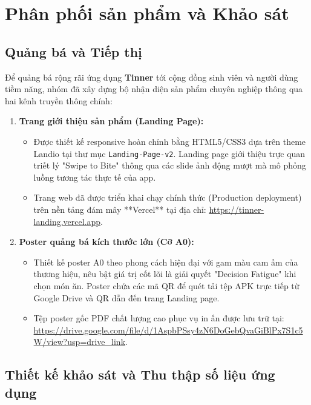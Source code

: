 \section{Phân phối sản phẩm và Khảo sát}
\label{sec:product_distribution}

\subsection{Quảng bá và Tiếp thị}
\label{subsec:marketing_promo}

Để quảng bá rộng rãi ứng dụng \textbf{Tinner} tới cộng đồng sinh viên và người dùng tiềm năng, nhóm đã xây dựng bộ nhận diện sản phẩm chuyên nghiệp thông qua hai kênh truyền thông chính:

\begin{enumerate}
    \item \textbf{Trang giới thiệu sản phẩm (Landing Page):} 
    \begin{itemize}
        \item Được thiết kế responsive hoàn chỉnh bằng HTML5/CSS3 dựa trên theme Landio tại thư mục \texttt{Landing-Page-v2}. Landing page giới thiệu trực quan triết lý "Swipe to Bite" thông qua các slide ảnh động mượt mà mô phỏng luồng tương tác thực tế của app.
        \item Trang web đã được triển khai chạy chính thức (Production deployment) trên nền tảng đám mây **Vercel** tại địa chỉ: \url{https://tinner-landing.vercel.app}.
    \end{itemize}
    
    \item \textbf{Poster quảng bá kích thước lớn (Cỡ A0):}
    \begin{itemize}
        \item Thiết kế poster A0 theo phong cách hiện đại với gam màu cam ấm của thương hiệu, nêu bật giá trị cốt lõi là giải quyết "Decision Fatigue" khi chọn món ăn. Poster chứa các mã QR để quét tải tệp APK trực tiếp từ Google Drive và QR dẫn đến trang Landing page.
        \item Tệp poster gốc PDF chất lượng cao phục vụ in ấn được lưu trữ tại: \url{https://drive.google.com/file/d/1AspbPSsy4zN6DoGebQvaGiBlPx7S1c5W/view?usp=drive_link}.
    \end{itemize}
\end{enumerate}

\subsection{Thiết kế khảo sát và Thu thập số liệu ứng dụng}
\label{subsec:survey_design_analytics}

